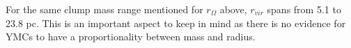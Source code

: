 For the same clump mass range mentioned for $r_Ω$ above, $r_{vir}$ spans from 5.1 to 23.8 pc. This is an important aspect to keep in mind as there is no evidence for YMCs to have a proportionality between mass and radius. \cite{Bedini_2013}